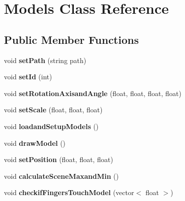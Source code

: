 \hypertarget{class_models}{\section{Models Class Reference}
\label{class_models}
}
\subsection*{Public Member Functions}
\begin{DoxyCompactItemize}
\item 
\hypertarget{class_models_abdc05877ebd15ede3efeda3935e84d37}{void {\bfseries set\-Path} (string path)}\label{class_models_abdc05877ebd15ede3efeda3935e84d37}

\item 
\hypertarget{class_models_ad367f36aa2f40d7fa2307e13ed173b09}{void {\bfseries set\-Id} (int)}\label{class_models_ad367f36aa2f40d7fa2307e13ed173b09}

\item 
\hypertarget{class_models_a501e84d868f70f12f2b56942ab58c8a2}{void {\bfseries set\-Rotation\-Axisand\-Angle} (float, float, float, float)}\label{class_models_a501e84d868f70f12f2b56942ab58c8a2}

\item 
\hypertarget{class_models_ad701bb5644501c8174aab84256fb4240}{void {\bfseries set\-Scale} (float, float, float)}\label{class_models_ad701bb5644501c8174aab84256fb4240}

\item 
\hypertarget{class_models_a72f630623ba8b6076ba5020a2ee5d325}{void {\bfseries loadand\-Setup\-Models} ()}\label{class_models_a72f630623ba8b6076ba5020a2ee5d325}

\item 
\hypertarget{class_models_a8de77c9dc8890acd5a560d6c0f2de2e3}{void {\bfseries draw\-Model} ()}\label{class_models_a8de77c9dc8890acd5a560d6c0f2de2e3}

\item 
\hypertarget{class_models_aaf29e46cf7611b8cd90fc70de6775058}{void {\bfseries set\-Position} (float, float, float)}\label{class_models_aaf29e46cf7611b8cd90fc70de6775058}

\item 
\hypertarget{class_models_a42e598829b2e6add55531aa97acd2071}{void {\bfseries calculate\-Scene\-Maxand\-Min} ()}\label{class_models_a42e598829b2e6add55531aa97acd2071}

\item 
\hypertarget{class_models_a475c8c61cf3e7109f6cc452a67911dec}{void {\bfseries checkif\-Fingers\-Touch\-Model} (vector$<$ float $>$)}\label{class_models_a475c8c61cf3e7109f6cc452a67911dec}


\end{DoxyCompactItemize}
